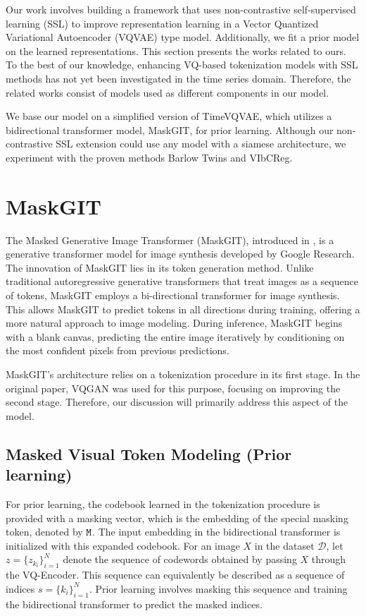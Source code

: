\documentclass[../../thesis.tex]{subfiles}
\begin{document}
Our work involves building a framework that uses non-contrastive self-supervised learning (SSL) to improve representation learning in a Vector Quantized Variational Autoencoder (VQVAE) type model. Additionally, we fit a prior model on the learned representations. This section presents the works related to ours. To the best of our knowledge, enhancing VQ-based tokenization models with SSL methods has not yet been investigated in the time series domain. Therefore, the related works consist of models used as different components in our model.\newline

We base our model on a simplified version of TimeVQVAE, which utilizes a bidirectional transformer model, MaskGIT, for prior learning. Although our non-contrastive SSL extension could use any model with a siamese architecture, we experiment with the proven methods Barlow Twins and VIbCReg.

\section{MaskGIT}

The Masked Generative Image Transformer (MaskGIT), introduced in \cite{chang2022maskgit}, is a generative transformer model for image synthesis developed by Google Research. The innovation of MaskGIT lies in its token generation method. Unlike traditional autoregressive generative transformers that treat images as a sequence of tokens, MaskGIT employs a bi-directional transformer for image synthesis. This allows MaskGIT to predict tokens in all directions during training, offering a more natural approach to image modeling. During inference, MaskGIT begins with a blank canvas, predicting the entire image iteratively by conditioning on the most confident pixels from previous predictions.\newline

MaskGIT's architecture relies on a tokenization procedure in its first stage. In the original paper, VQGAN \cite{VQGAN} was used for this purpose, focusing on improving the second stage. Therefore, our discussion will primarily address this aspect of the model.

\subsection{Masked Visual Token Modeling (Prior learning)}

For prior learning, the codebook learned in the tokenization procedure is provided with a masking vector, which is the embedding of the special masking token, denoted by $\texttt{M}$. The input embedding in the bidirectional transformer is initialized with this expanded codebook. For an image $X$ in the dataset $\mathcal{D}$, let $z = \{z_{k_i}\}_{i=1}^N$ denote the sequence of codewords obtained by passing $X$ through the VQ-Encoder. This sequence can equivalently be described as a sequence of indices $s = \{k_i\}_{i=1}^N$. Prior learning involves masking this sequence and training the bidirectional transformer to predict the masked indices.
\newline
\end{document}
